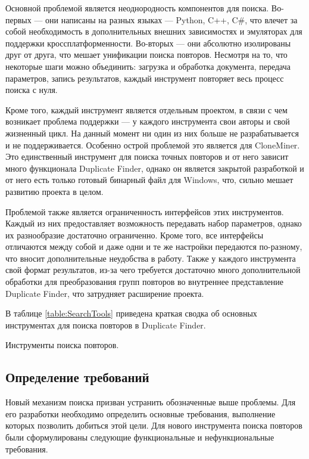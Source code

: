 \documentclass[14pt]{matmex-diploma-custom}
\begin{document}
Основной проблемой является неоднородность компонентов для поиска. Во-первых --- они написаны на разных языках --- Python, C++, C\#, что влечет за собой необходимость в дополнительных внешних зависимостях и эмуляторах для поддержки кроссплатформенности. Во-вторых --- они абсолютно изолированы друг от друга, что мешает унификации поиска повторов. Несмотря на то, что некоторые шаги можно объединить: загрузка и обработка документа, передача параметров, запись результатов, каждый инструмент повторяет весь процесс поиска с нуля.

Кроме того, каждый инструмент является отдельным проектом, в связи с чем возникает проблема поддержки ---  у каждого инструмента свои авторы и свой жизненный цикл. На данный момент ни один из них больше не разрабатывается и не поддерживается. Особенно острой проблемой это является для CloneMiner. Это единственный инструмент для поиска точных повторов и от него зависит много функционала Duplicate Finder, однако он является закрытой разработкой и от него есть только готовый бинарный файл для Windows, что, сильно мешает развитию проекта в целом. 

Проблемой также является ограниченность интерфейсов этих инструментов. Каждый из них предоставляет возможность передавать набор параметров, однако их разнообразие достаточно ограниченно. Кроме того, все интерфейсы отличаются между собой и даже одни и те же настройки передаются по-разному, что вносит дополнительные неудобства в работу. Также у каждого инструмента свой формат результатов, из-за чего требуется достаточно много дополнительной обработки для преобразования групп повторов во внутреннее представление Duplicate Finder, что затрудняет расширение проекта.

В таблице \ref{table:SearchTools} приведена краткая сводка об основных инструментах для поиска повторов в Duplicate Finder.

\begin{table}[h!]
	\centering
	
	\caption{Инструменты поиска повторов.}
	\label{table:SearchTools}
\end{table}

\subsection{Определение требований}
Новый механизм поиска призван устранить обозначенные выше проблемы. Для его разработки необходимо определить основные требования, выполнение которых позволить добиться этой цели. Для нового инструмента поиска повторов были сформулированы следующие функциональные и нефункциональные требования.
\end{document}

